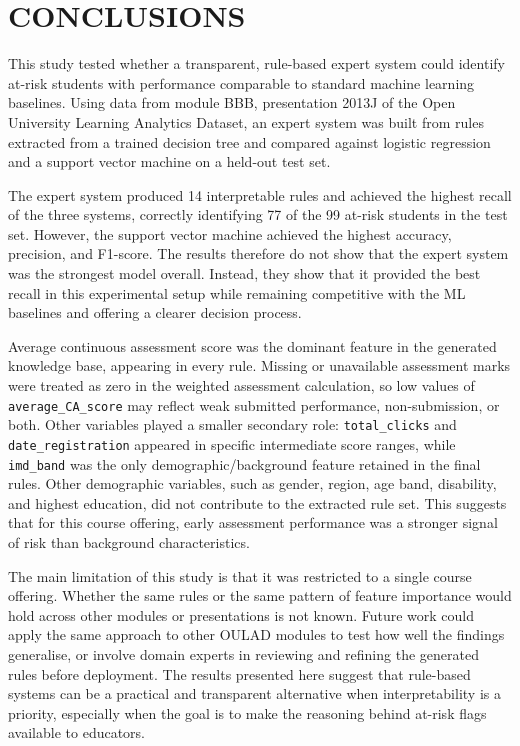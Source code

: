 \section{CONCLUSIONS}

This study tested whether a transparent, rule-based expert system could identify at-risk students with performance comparable to standard machine learning baselines. Using data from module BBB, presentation 2013J of the Open University Learning Analytics Dataset, an expert system was built from rules extracted from a trained decision tree and compared against logistic regression and a support vector machine on a held-out test set.

The expert system produced 14 interpretable rules and achieved the highest recall of the three systems, correctly identifying 77 of the 99 at-risk students in the test set. However, the support vector machine achieved the highest accuracy, precision, and F1-score. The results therefore do not show that the expert system was the strongest model overall. Instead, they show that it provided the best recall in this experimental setup while remaining competitive with the ML baselines and offering a clearer decision process.

Average continuous assessment score was the dominant feature in the generated knowledge base, appearing in every rule. Missing or unavailable assessment marks were treated as zero in the weighted assessment calculation, so low values of \texttt{average\_CA\_score} may reflect weak submitted performance, non-submission, or both. Other variables played a smaller secondary role: \texttt{total\_clicks} and \texttt{date\_registration} appeared in specific intermediate score ranges, while \texttt{imd\_band} was the only demographic/background feature retained in the final rules. Other demographic variables, such as gender, region, age band, disability, and highest education, did not contribute to the extracted rule set. This suggests that for this course offering, early assessment performance was a stronger signal of risk than background characteristics.

The main limitation of this study is that it was restricted to a single course offering. Whether the same rules or the same pattern of feature importance would hold across other modules or presentations is not known. Future work could apply the same approach to other OULAD modules to test how well the findings generalise, or involve domain experts in reviewing and refining the generated rules before deployment. The results presented here suggest that rule-based systems can be a practical and transparent alternative when interpretability is a priority, especially when the goal is to make the reasoning behind at-risk flags available to educators.
